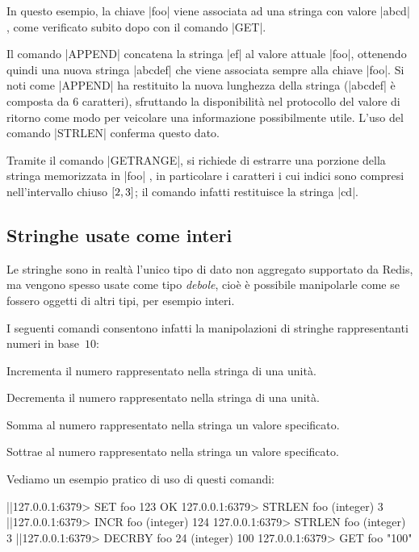 In questo esempio, la chiave \cverb|foo| viene associata ad una stringa con valore \cverb|abcd|
, come verificato subito dopo con il comando \cverb|GET|. 

Il comando \cverb|APPEND|  concatena la stringa \cverb|ef| al valore attuale \cverb|foo|,
ottenendo quindi una nuova stringa \cverb|abcdef| che viene associata sempre alla chiave \cverb|foo|.
Si noti come \cverb|APPEND| ha restituito la nuova lunghezza della stringa (\cverb|abcdef| è composta
da $6$ caratteri), sfruttando la disponibilità nel protocollo del valore di ritorno come modo per
veicolare una informazione possibilmente utile. L'uso del comando \cverb|STRLEN| conferma questo
dato.

Tramite il comando \cverb|GETRANGE|, si richiede di estrarre una porzione della stringa memorizzata
in \cverb|foo| , in particolare i caratteri i cui indici sono compresi nell'intervallo
chiuso $\interval{2}{3}$; il comando infatti restituisce la stringa \cverb|cd|.

\subsection{Stringhe usate come interi}

Le stringhe sono in realtà l'unico tipo di dato non aggregato supportato da Redis, ma vengono spesso
usate come tipo \emph{debole}, cioè è possibile manipolarle come se fossero oggetti di altri tipi,
per esempio interi.

I seguenti comandi consentono infatti la manipolazioni di stringhe rappresentanti numeri in base~$10$:

\begin{description}[style=nextline,font={\bfseries\ttfamily}]
	\item[INCR <key>] Incrementa il numero rappresentato nella stringa di una unità.
	\item[DECR <key>] Decrementa il numero rappresentato nella stringa di una unità.
	\item[INCRBY <key> <val>] Somma al numero rappresentato nella stringa un valore
	spe\-ci\-fi\-ca\-to.
	\item[DECRBY <key> <val>] Sottrae al numero rappresentato nella stringa un valore
	spe\-ci\-fi\-ca\-to.
\end{description}

Vediamo un esempio pratico di uso di questi comandi:

\begin{commentedsource}[style=redis]
|\lnote|127.0.0.1:6379> SET foo 123
OK
127.0.0.1:6379> STRLEN foo
(integer) 3
|\lnote|127.0.0.1:6379> INCR foo
(integer) 124
127.0.0.1:6379> STRLEN foo
(integer) 3
|\lnote|127.0.0.1:6379> DECRBY foo 24
(integer) 100
127.0.0.1:6379> GET foo
"100"
\end{commentedsource}

